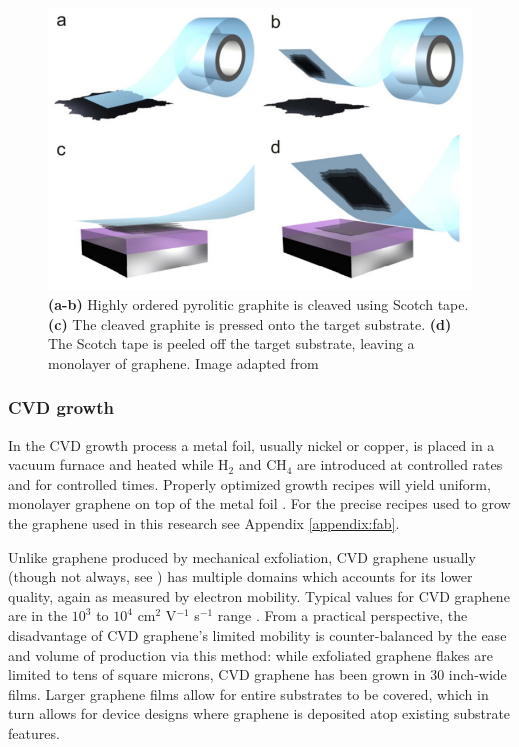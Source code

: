 \documentclass[edeposit,fullpage,draftthesis]{uiucthesis2009}
\begin{document}
            \begin{figure}
            \centering
            \includegraphics[width=0.6\linewidth]{images/experimentaltechniques/exfoliation.png}
            \caption[Mechanical exfoliation of graphene]{
                \textbf{(a-b)} Highly ordered pyrolitic graphite is cleaved using Scotch tape.
                \textbf{(c)} The cleaved graphite is pressed onto the target substrate.
                \textbf{(d)} The Scotch tape is peeled off the target substrate, leaving a monolayer of graphene.
                Image adapted from \cite{novoselov2012two}}
            \label{fig:exfoliation}
            \end{figure}

        
            \subsubsection{CVD growth}

            In the CVD growth process a metal foil, usually nickel or copper, is
        placed in a vacuum furnace and heated while H$_2$ and CH$_4$ are 
        introduced at controlled rates and for controlled times. Properly
        optimized growth recipes will yield uniform, monolayer graphene on
        top of the metal foil \cite{reina2008large, kim2009large, li2009large, li2009transfer}. 
        For the precise recipes used to grow the graphene used in this research see Appendix \ref{appendix:fab}.
        
        Unlike graphene produced by mechanical
        exfoliation, CVD graphene usually (though not always, see 
        \cite{Petrone2012}) has multiple domains \cite{Li2010} which accounts
        for its lower quality, again as measured by electron mobility. Typical
        values for CVD graphene are in the $10^3$ to $10^4$ cm$^2$ V$^{-1}$
        s$^{-1}$ range \cite{Petrone2012}. From a practical perspective, the 
        disadvantage of CVD graphene's limited mobility
        is counter-balanced by the ease and volume of production via this method:
        while exfoliated graphene flakes are limited to tens of square microns, 
        CVD graphene has been grown in 30 inch-wide films\cite{bae2010roll}.
        Larger graphene films allow for entire substrates to be covered, which 
        in turn allows for device designs where graphene is deposited atop existing
        substrate features.
        
\end{document}
